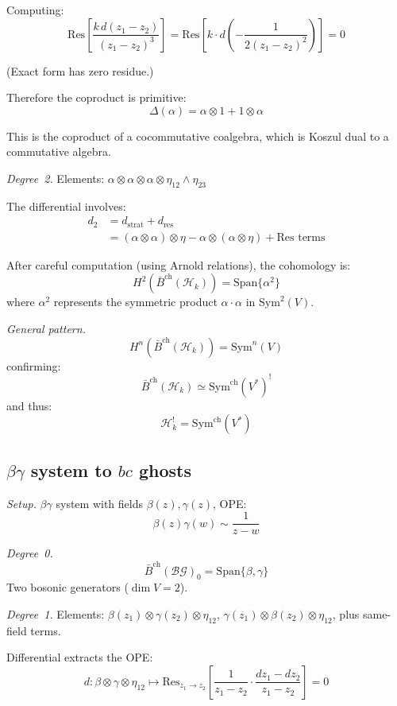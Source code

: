 Computing:
\[\text{Res}\left[\frac{k \, d(z_1-z_2)}{(z_1-z_2)^3}\right] = 
   \text{Res}\left[k \cdot d\left(-\frac{1}{2(z_1-z_2)^2}\right)\right] = 0\]

(Exact form has zero residue.)

Therefore the coproduct is primitive:
\[\Delta(\alpha) = \alpha \otimes 1 + 1 \otimes \alpha\]

This is the coproduct of a cocommutative coalgebra, which is Koszul dual to a
commutative algebra.

\emph{Degree~2.}
Elements: $\alpha \otimes \alpha \otimes \alpha \otimes \eta_{12} \wedge \eta_{23}$

The differential involves:
\begin{align*}
d_2 &= d_{\text{strat}} + d_{\text{res}} \\
&= (\alpha \otimes \alpha) \otimes \eta - \alpha \otimes (\alpha \otimes \eta) + 
    \text{Res terms}
\end{align*}

After careful computation (using Arnold relations), the cohomology is:
\[H^2(\bar{B}^{\text{ch}}(\mathcal{H}_k)) = \text{Span}\{\alpha^2\}\]
where $\alpha^2$ represents the symmetric product $\alpha \cdot \alpha$ in 
$\text{Sym}^2(V)$.

\emph{General pattern.}
\[H^n(\bar{B}^{\text{ch}}(\mathcal{H}_k)) = \text{Sym}^n(V)\]
confirming:
\[\bar{B}^{\text{ch}}(\mathcal{H}_k) \simeq \mathrm{Sym}^{\mathrm{ch}}(V^*)^!\]
and thus:
\[\mathcal{H}_k^! = \mathrm{Sym}^{\mathrm{ch}}(V^*)\]

\subsection{\texorpdfstring{$\beta\gamma$ system to $bc$ ghosts}{Beta-gamma system to bc ghosts}}

\noindent\emph{Setup.} $\beta\gamma$ system with fields $\beta(z), \gamma(z)$, OPE:
\[\beta(z)\gamma(w) \sim \frac{1}{z-w}\]

\emph{Degree~0.}
\[\bar{B}^{\text{ch}}(\mathcal{BG})_0 = \text{Span}\{\beta, \gamma\}\]
Two bosonic generators ($\dim V = 2$).

\emph{Degree~1.}
Elements: $\beta(z_1) \otimes \gamma(z_2) \otimes \eta_{12}$,
$\gamma(z_1) \otimes \beta(z_2) \otimes \eta_{12}$, plus same-field terms.

Differential extracts the OPE:
\[d: \beta \otimes \gamma \otimes \eta_{12} \mapsto
   \text{Res}_{z_1 \to z_2}\left[\frac{1}{z_1-z_2} \cdot \frac{dz_1-dz_2}{z_1-z_2}\right] = 0\]

